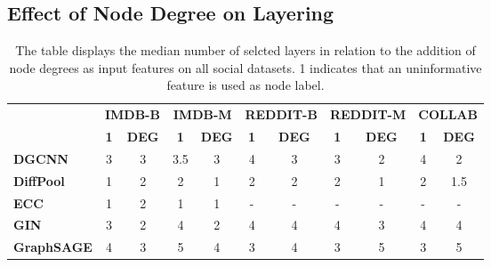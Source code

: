 \documentclass{article}
\begin{document}
\subsection{Effect of Node Degree on Layering}
\begin{table}[ht]
\renewcommand\arraystretch{1.2}
\label{tab:effect-of-degree}
\caption{The table displays the median number of selcted layers in relation to the addition of node degrees as input features on all social datasets. 1 indicates that an uninformative feature is used as node label.}
\begin{center}
\begin{tabular}{lcccccccccc}
\cmidrule{2-11}
          & \multicolumn{2}{c}{\textbf{IMDB-B}} & \multicolumn{2}{c}{\textbf{IMDB-M}} & \multicolumn{2}{c}{\textbf{REDDIT-B}} & \multicolumn{2}{c}{\textbf{REDDIT-M}} & \multicolumn{2}{c}{\textbf{COLLAB}} \\
          \cmidrule(lr){2-3}\cmidrule(lr){4-5}\cmidrule(lr){6-7}\cmidrule(lr){8-9}\cmidrule(lr){10-11}
          & \textbf{1}           & \textbf{DEG} & \textbf{1}           & \textbf{DEG} & \textbf{1}           & \textbf{DEG} & \textbf{1}           & \textbf{DEG} & \textbf{1}           & \textbf{DEG}          \\
          \midrule
\textbf{DGCNN}     & 3           & 3            & 3.5          & 3           & 4          & 3            & 3          & 2            & 4           & 2            \\
\textbf{DiffPool}  & 1           & 2            & 2            & 1           & 2          & 2            & 2          & 1            & 2           & 1.5          \\
\textbf{ECC}       & 1           & 2            & 1            & 1           & -          & -            & -          & -            & -           & -            \\
\textbf{GIN}       & 3           & 2            & 4            & 2           & 4          & 4            & 4          & 3            & 4           & 4            \\
\textbf{GraphSAGE} & 4           & 3            & 5            & 4           & 3          & 4            & 3          & 5            & 3           & 5\\           
\bottomrule
\end{tabular}
\end{center}
\end{table}

\newpage
\end{document}
